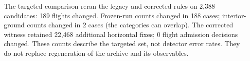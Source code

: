 The targeted comparison reran the legacy and corrected rules on
2,388 candidates: 189 flights changed.
Frozen-run counts changed in 188 cases; interior-ground counts
changed in 2 cases (the categories can overlap).
The corrected witness retained 22,468 additional horizontal fixes;
0 flight admission decisions changed.
These counts describe the targeted set, not detector error rates.
They do not replace regeneration of the archive and its observables.

